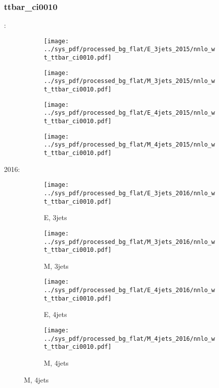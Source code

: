 \documentclass{beamer}
\begin{document}
\begin{frame}
\frametitle{ttbar_ci0010}
\fontsize{5}{1}:
\begin{figure}
\centering
\begin{subfigure}[b]{0.24\textwidth}
\texttt{[image: ../sys\_pdf/processed\_bg\_flat/E\_3jets\_2015/nnlo\_wt\_ttbar\_ci0010.pdf]}
\end{subfigure}
\begin{subfigure}[b]{0.24\textwidth}
\texttt{[image: ../sys\_pdf/processed\_bg\_flat/M\_3jets\_2015/nnlo\_wt\_ttbar\_ci0010.pdf]}
\end{subfigure}
\begin{subfigure}[b]{0.24\textwidth}
\texttt{[image: ../sys\_pdf/processed\_bg\_flat/E\_4jets\_2015/nnlo\_wt\_ttbar\_ci0010.pdf]}
\end{subfigure}
\begin{subfigure}[b]{0.24\textwidth}
\texttt{[image: ../sys\_pdf/processed\_bg\_flat/M\_4jets\_2015/nnlo\_wt\_ttbar\_ci0010.pdf]}
\end{subfigure}
\end{figure}
2016:
\begin{figure}
\centering
\begin{subfigure}[b]{0.24\textwidth}
\texttt{[image: ../sys\_pdf/processed\_bg\_flat/E\_3jets\_2016/nnlo\_wt\_ttbar\_ci0010.pdf]}
\captionsetup{font=tiny}
\caption{E, 3jets}
\end{subfigure}
\begin{subfigure}[b]{0.24\textwidth}
\texttt{[image: ../sys\_pdf/processed\_bg\_flat/M\_3jets\_2016/nnlo\_wt\_ttbar\_ci0010.pdf]}
\captionsetup{font=tiny}
\caption{M, 3jets}
\end{subfigure}
\begin{subfigure}[b]{0.24\textwidth}
\texttt{[image: ../sys\_pdf/processed\_bg\_flat/E\_4jets\_2016/nnlo\_wt\_ttbar\_ci0010.pdf]}
\captionsetup{font=tiny}
\caption{E, 4jets}
\end{subfigure}
\begin{subfigure}[b]{0.24\textwidth}
\texttt{[image: ../sys\_pdf/processed\_bg\_flat/M\_4jets\_2016/nnlo\_wt\_ttbar\_ci0010.pdf]}
\captionsetup{font=tiny}
\caption{M, 4jets}
\end{subfigure}
\end{figure}
\end{frame}
\end{document}
